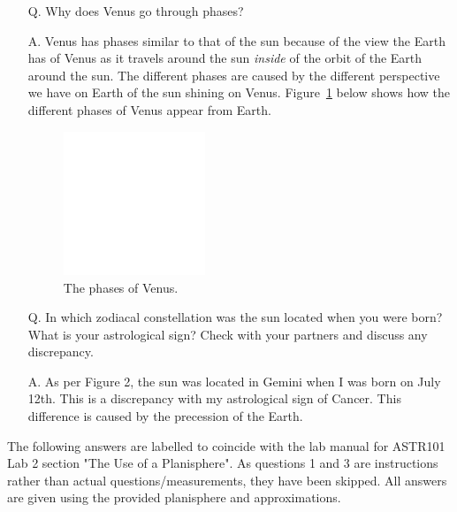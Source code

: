 \documentclass{article}
\begin{document}
\begin{enumerate}
\item[Q.] Why does Venus go through phases? 
\item[A.] Venus has phases similar to that of the sun because of the view the Earth has of Venus as it travels
around the sun \textit{inside} of the orbit of the Earth around the sun. The different phases are caused by the different
perspective we have on Earth of the sun shining on Venus. Figure~\ref{fig:pov} below shows how the different phases of
Venus appear from Earth.

\addtocounter{figure}{2}
\begin{figure}
\centering
\includegraphics[width=0.4\textwidth]{images/blank}
\caption{The phases of Venus.\label{fig:pov}}
\end{figure}

\item[Q.] In which zodiacal constellation was the sun located when you were born? What is your astrological sign?
Check with your partners and discuss any discrepancy.
\item[A.] As per Figure 2, the sun was located in Gemini when I was born on July 12th. This is a discrepancy with
my astrological sign of Cancer. This difference is caused by the precession of the Earth.
\end{enumerate}

The following answers are labelled to coincide with the lab manual for ASTR101 Lab 2 section
"The Use of a Planisphere". As
questions 1 and 3 are instructions rather than actual questions/measurements, they have been skipped. All answers 
are given using the provided planisphere and approximations.
\end{document}
